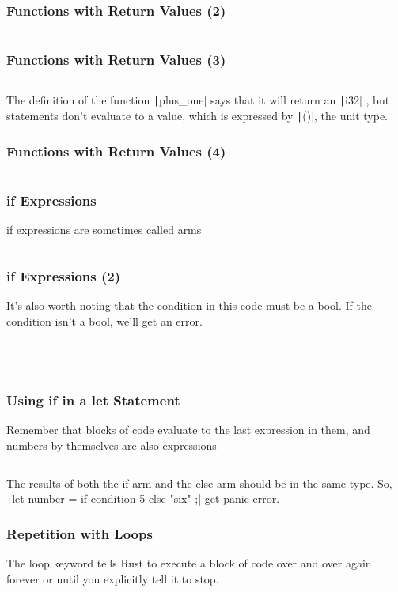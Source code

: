 \documentclass{beamer}
\begin{document}
	\begin{frame}[fragile]
		\frametitle{Functions with Return Values (2)}
		\inputminted{rust}{./code/function-return.rs}
	\end{frame}
	
	\begin{frame}[fragile]
		\frametitle{Functions with Return Values (3)}
		\inputminted{rust}{./code/function-return2.rs}
		
		The definition of the function \texttt|plus_one|  says that it will return an \texttt|i32| , but statements don’t evaluate to a value, which is expressed by \texttt|()|, the unit type.
	\end{frame}
	
	\begin{frame}[fragile]
		\frametitle{Functions with Return Values (4)}
		\inputminted{shell}{./code/function-return3.shell}
	\end{frame}
	
	\begin{frame}[fragile]
		\frametitle{if Expressions}
		if expressions are sometimes called arms
		\inputminted{rust}{./code/if.rs}
	\end{frame}
	
	\begin{frame}[fragile]
		\frametitle{if Expressions (2)}
		It’s also worth noting that the condition in this code must be a bool. If the condition isn’t a bool, we’ll get an error.
		\begin{columns}
			\inputminted{rust}{./code/if-err.rs}
			
			\inputminted{rust}{./code/if-err-correct.rs}
		\end{columns}
		\inputminted{shell}{./code/if-err.shell}
	\end{frame}
	
	\begin{frame}[fragile]
		\frametitle{Using if in a let Statement}
		Remember that blocks of code evaluate to the last expression in them, and numbers by themselves are also expressions
		\inputminted{rust}{./code/if-let.rs}
		
		The results of both the if arm and the else arm should be in the same type. So, \texttt|let number = if condition { 5 } else { "six" };| get panic error.
	\end{frame}
	
	
	\begin{frame}[fragile]
		\frametitle{Repetition with Loops}
		The loop keyword tells Rust to execute a block of code over and over again forever or until you explicitly tell it to stop.
		\inputminted{rust}{./code/loop.rs}
	\end{frame}
	
\end{document}
